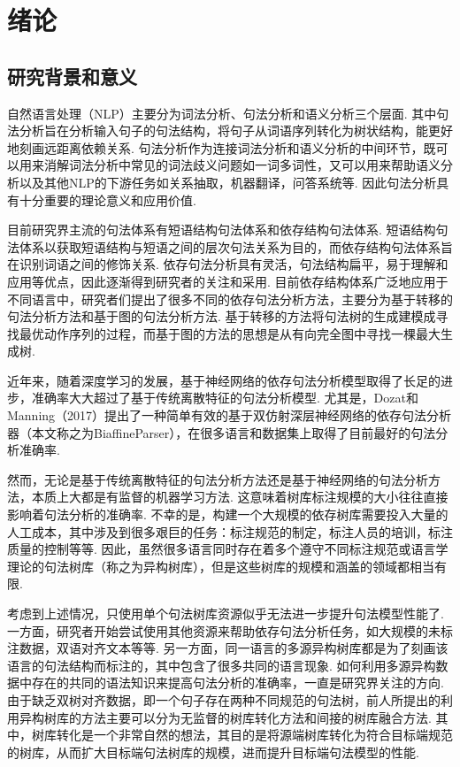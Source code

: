 \chapter{绪论}
\section{研究背景和意义}
自然语言处理（NLP）主要分为词法分析、句法分析和语义分析三个层面.
其中句法分析旨在分析输入句子的句法结构，将句子从词语序列转化为树状结构，能更好地刻画远距离依赖关系.
句法分析作为连接词法分析和语义分析的中间环节，既可以用来消解词法分析中常见的词法歧义问题如一词多词性，又可以用来帮助语义分析以及其他NLP的下游任务如关系抽取，机器翻译，问答系统等.
因此句法分析具有十分重要的理论意义和应用价值.

目前研究界主流的句法体系有短语结构句法体系和依存结构句法体系. 短语结构句法体系以获取短语结构与短语之间的层次句法关系为目的，而依存结构句法体系旨在识别词语之间的修饰关系. 依存句法分析具有灵活，句法结构扁平，易于理解和应用等优点，因此逐渐得到研究者的关注和采用. 目前依存结构体系广泛地应用于不同语言中，研究者们提出了很多不同的依存句法分析方法，主要分为基于转移的句法分析方法和基于图的句法分析方法. 基于转移的方法将句法树的生成建模成寻找最优动作序列的过程，而基于图的方法的思想是从有向完全图中寻找一棵最大生成树.

近年来，随着深度学习的发展，基于神经网络的依存句法分析模型取得了长足的进步，准确率大大超过了基于传统离散特征的句法分析模型. 尤其是，Dozat和Manning（2017）提出了一种简单有效的基于双仿射深层神经网络的依存句法分析器（本文称之为BiaffineParser），在很多语言和数据集上取得了目前最好的句法分析准确率.

然而，无论是基于传统离散特征的句法分析方法还是基于神经网络的句法分析方法，本质上大都是有监督的机器学习方法. 这意味着树库标注规模的大小往往直接影响着句法分析的准确率.
不幸的是，构建一个大规模的依存树库需要投入大量的人工成本，其中涉及到很多艰巨的任务：标注规范的制定，标注人员的培训，标注质量的控制等等. 因此，虽然很多语言同时存在着多个遵守不同标注规范或语言学理论的句法树库（称之为异构树库），但是这些树库的规模和涵盖的领域都相当有限.

考虑到上述情况，只使用单个句法树库资源似乎无法进一步提升句法模型性能了. 一方面，研究者开始尝试使用其他资源来帮助依存句法分析任务，如大规模的未标注数据，双语对齐文本等等. 另一方面，同一语言的多源异构树库都是为了刻画该语言的句法结构而标注的，其中包含了很多共同的语言现象. 如何利用多源异构数据中存在的共同的语法知识来提高句法分析的准确率，一直是研究界关注的方向. 由于缺乏双树对齐数据，即一个句子存在两种不同规范的句法树，前人所提出的利用异构树库的方法主要可以分为无监督的树库转化方法和间接的树库融合方法. 其中，树库转化是一个非常自然的想法，其目的是将源端树库转化为符合目标端规范的树库，从而扩大目标端句法树库的规模，进而提升目标端句法模型的性能.

